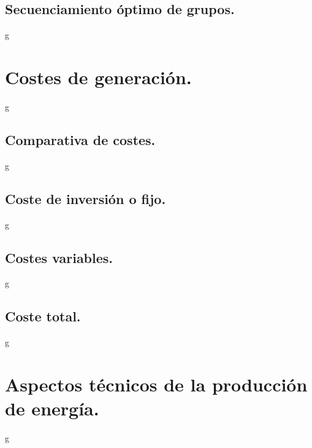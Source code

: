 \subsection{Secuenciamiento óptimo de grupos.}
g
\section{Costes de generación.}
g
\subsection{Comparativa de costes.}
g
\subsection{Coste de inversión o fijo.}
g
\subsection{Costes variables.}
g
\subsection{Coste total.}
g
\section{Aspectos técnicos de la producción de energía.}
g